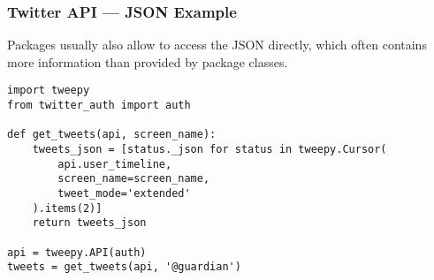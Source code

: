 \begin{frame}[fragile]
    \frametitle{Twitter API --- JSON Example}

    Packages usually also allow to access the JSON directly, which
    often contains more information than provided by package classes.

    \begin{verbatim}
import tweepy
from twitter_auth import auth

def get_tweets(api, screen_name):
    tweets_json = [status._json for status in tweepy.Cursor(
        api.user_timeline,
        screen_name=screen_name,
        tweet_mode='extended'
    ).items(2)]
    return tweets_json

api = tweepy.API(auth)
tweets = get_tweets(api, '@guardian')
    \end{verbatim}
\end{frame}

